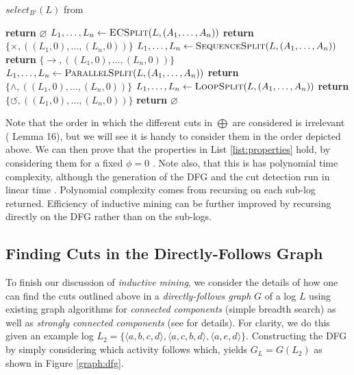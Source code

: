 \documentclass[a4paper]{IEEEtran}
\begin{document}
\begin{algorithm}[h!]
\caption{$select_{B'}(L)$ from \cite{inductivemining-constructive}}
\begin{algorithmic}[1]
    \State \textbf{return} $\varnothing$
\EndIf
{}
    \State $L_1, \dots, L_n \gets \Call{ECSplit}{L, (A_1, \dots, A_n)} $
    \State \textbf{return} $\{\times, ((L_1, 0), \dots, (L_n, 0))\}$
\EndIf
{}
    \State $L_1, \dots, L_n \gets \Call{SequenceSplit}{L, (A_1, \dots, A_n)} $
    \State \textbf{return} $\{\rightarrow, ((L_1, 0), \dots, (L_n, 0))\}$
\EndIf
{}
    \State $L_1, \dots, L_n \gets \Call{ParallelSplit}{L, (A_1, \dots, A_n)} $
    \State \textbf{return} $\{\wedge, ((L_1, 0), \dots, (L_n, 0))\}$
\EndIf
{}
    \State $L_1, \dots, L_n \gets \Call{LoopSplit}{L, (A_1, \dots, A_n)} $
    \State \textbf{return} $\{\circlearrowleft, ((L_1, 0), \dots, (L_n, 0))\}$
\EndIf
\State \textbf{return} $\varnothing$
\end{algorithmic}
\label{select}
\end{algorithm}
Note that the order in which the different cuts in $\bigoplus$ are considered is irrelevant (\cite{inductivemining-constructive} Lemma 16), but we will see it is handy to consider them in the order depicted above. We can then prove that the properties in List \ref{list:properties} hold, by considering them for a fixed $\phi = 0$ \cite{inductivemining-constructive}.
Note also, that this is has polynomial time complexity, although the generation of the DFG and the cut detection run in linear time \cite{evermann2016scalable, tarjan1972depth}. Polynomial complexity comes from recursing on each sub-log returned. Efficiency of inductive mining can be further improved by recursing directly on the DFG rather than on the sub-logs.

\subsection{Finding Cuts in the Directly-Follows Graph}
To finish our discussion of \textit{inductive mining}, we consider the details of how one can find the cuts outlined above in a \textit{directly-follows graph} $G$ of a log $L$ using existing graph algorithms for \textit{connected components} (simple breadth search) as well as \textit{strongly connected components} (see \cite{tarjan1972depth} for details). For clarity, we do this given an example log $L_2 = \{ \langle a,b,c,d \rangle, \langle a,c,b,d \rangle, \langle a,e,d \rangle \}$. Constructing the DFG by simply considering which activity follows which, yields $G_L = G(L_2)$ as shown in Figure \ref{graph:dfg}.
\end{document}
